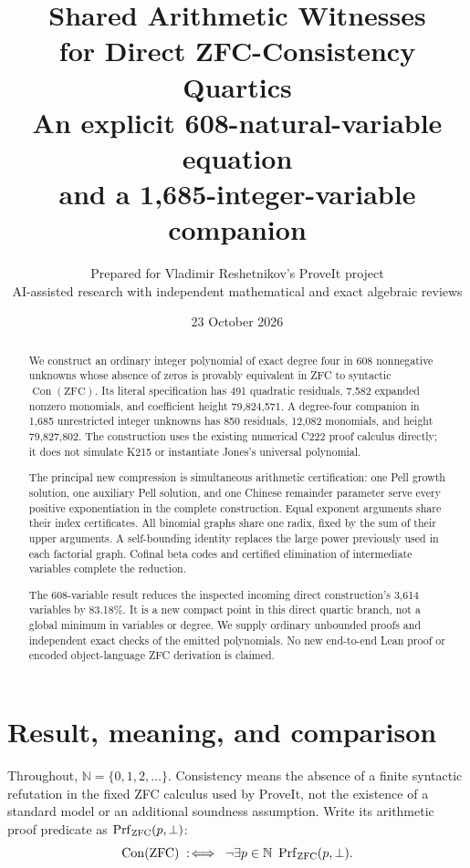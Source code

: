 \documentclass[11pt,letterpaper]{article}
\title{\textbf{Shared Arithmetic Witnesses\\for Direct ZFC-Consistency Quartics}\\[5pt]
\large An explicit 608-natural-variable equation\\and a 1,685-integer-variable companion}
\author{Prepared for Vladimir Reshetnikov's ProveIt project\\
\small AI-assisted research with independent mathematical and exact algebraic reviews}
\date{23 October 2026}
\newcommand{\N}{\mathbb N}
\newcommand{\Con}{\operatorname{Con}}
\theoremstyle{definition}\newtheorem{definition}[theorem]{Definition}
\theoremstyle{remark}\newtheorem{remark}[theorem]{Remark}
\begin{document}
\maketitle
\begin{abstract}
We construct an ordinary integer polynomial of exact degree four in 608
nonnegative unknowns whose absence of zeros is provably equivalent in ZFC
to syntactic $\Con(\mathrm{ZFC})$. Its literal specification has 491 quadratic
residuals, 7,582 expanded nonzero monomials, and coefficient height
79,824,571. A degree-four companion in 1,685 unrestricted integer unknowns
has 850 residuals, 12,082 monomials, and height 79,827,802.
The construction uses the existing numerical C222 proof calculus directly;
it does not simulate K215 or instantiate Jones's universal polynomial.

The principal new compression is simultaneous arithmetic certification:
one Pell growth solution, one auxiliary Pell solution, and one Chinese
remainder parameter serve every positive exponentiation in the complete
construction. Equal exponent arguments share their index certificates.
All binomial graphs share one radix, fixed by the sum of their upper
arguments. A self-bounding identity replaces the large power previously
used in each factorial graph. Cofinal beta codes and certified elimination
of intermediate variables complete the reduction.

The 608-variable result reduces the inspected incoming direct construction's
3,614 variables by 83.18\%. It is a new compact point in this direct
quartic branch, not a global minimum in variables or degree. We supply
ordinary unbounded proofs and independent exact checks of the emitted
polynomials. No new end-to-end Lean proof or encoded object-language ZFC
derivation is claimed.
\end{abstract}
\newpage
\tableofcontents
\newpage

\section{Result, meaning, and comparison}

Throughout, $\N=\{0,1,2,\ldots\}$. Consistency means the absence of a
finite syntactic refutation in the fixed ZFC calculus used by ProveIt,
not the existence of a standard model or an additional soundness assumption.
Write its arithmetic proof predicate as $\operatorname{Prf}_{\rm ZFC}(p,\bot)$:
\[
 \Con(\mathrm{ZFC})\;:\!\iff\;
 \neg\exists p\in\N\ \operatorname{Prf}_{\rm ZFC}(p,\bot).
\]
\end{document}
